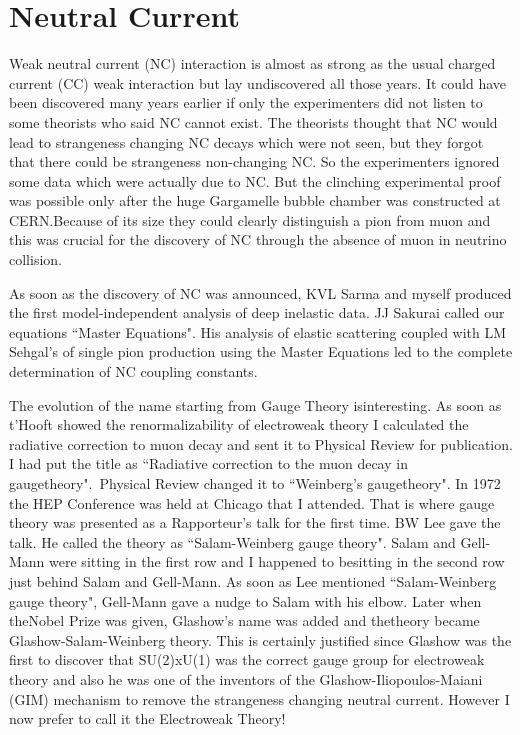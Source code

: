 \section*{Neutral Current}
Weak neutral current (NC) interaction is almost as strong as the usual 
charged current (CC) weak interaction but lay undiscovere\-d all those 
years. It could have been discovered many years earlier if only the 
experimenters did not listen to some theorists who said NC cannot exist. 
The theorists thought that NC would lead to strangeness changing NC 
decays which were not seen, but they forgot that there could be 
strangeness non-changing NC. So the experimenters ignored some data which 
were actually due to NC. But the clinching experimental proof was 
possible only after the huge Gargamelle bubble chamber was constructed 
at CERN.\break Because of its size they could clearly distinguish a pion 
from muon and this was crucial for the discovery of NC through the 
absence of muon in neutrino collision.
\smallskip

As soon as the discovery of NC was announced, KVL Sarma and myself 
produced the first model-independent analysis of deep inelastic data. JJ 
Sakurai called our equations ``Master Equations". His analysis of elastic 
scattering coupled with LM Sehgal's of single pion production using the 
Master Equations led to the complete determination of NC coupling 
constants.
\smallskip

The evolution of the name starting from Gauge Theory is\break interesting. As 
soon as t'Hooft showed the renormalizability of electroweak theory I 
calculated the radiative correction to muon decay and sent it to 
Physical Review for publication. I had put the title as ``Radiative 
correction to the muon decay in gauge\break theory".\ Physical Review changed 
it to ``Weinberg's gauge\break theory". In 1972 the HEP Conference was held at 
Chicago that I attended. That is where gauge theory was presented as a\break 
Rapporteur's talk for the first time. BW Lee gave the talk. He called 
the theory as ``Salam-Weinberg gauge theory". Salam and Gell-Mann were 
sitting in the first row and I happened to be\break sitting in the second row 
just behind Salam and Gell-Mann. As soon as Lee mentioned 
``Salam-Weinberg gauge theory", Gell-Mann gave a nudge to Salam with his 
elbow. Later when the\break Nobel Prize was given, Glashow's name was added 
and the\break theory became Glashow-Salam-Weinberg theory. This is certainly 
justi\-fied since Glashow was the first to discover that SU(2)xU(1) was 
the correct gauge group for electroweak theory and also he was one of 
the inventors of the Glashow-Iliopoulos-Maiani (GIM) mechanism to remove 
the strangeness changing neutral current. However I now prefer to call 
it the Electroweak Theory!

